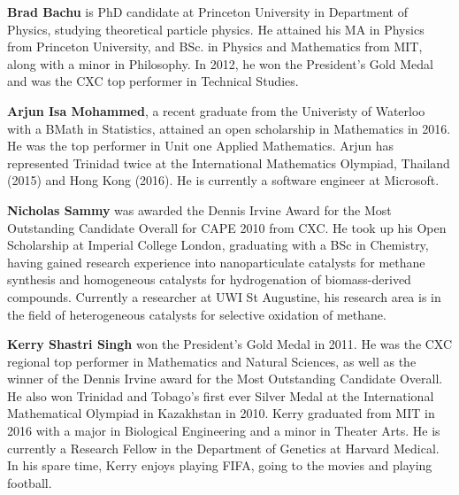 \textbf{Brad Bachu} is PhD candidate at Princeton
University in Department of Physics, studying theoretical particle physics.
He attained his MA in Physics from Princeton University, and BSc. in Physics 
and Mathematics from MIT, along with a minor in Philosophy. In 2012, 
he won the President's Gold Medal and was the CXC top performer in Technical Studies.

\vspace{5pt}

\noindent\textbf{Arjun Isa Mohammed}, a recent graduate from the 
Univeristy of Waterloo with a BMath in Statistics, 
attained an open scholarship in Mathematics in 2016.
He was the top performer in Unit one Applied Mathematics.
Arjun has represented Trinidad twice at the International
Mathematics Olympiad, Thailand (2015) and Hong Kong (2016).
He is currently a software engineer at Microsoft.
\vspace{5pt}

\noindent\textbf{Nicholas Sammy} was awarded the Dennis Irvine Award for 
the Most Outstanding Candidate Overall for CAPE 2010 from CXC. He took up 
his Open Scholarship at Imperial College London, graduating with a BSc in
Chemistry, having gained research experience into nanoparticulate catalysts 
for methane synthesis and homogeneous catalysts for hydrogenation of
biomass-derived compounds. Currently a researcher at UWI St Augustine,
his research area is in the field of heterogeneous catalysts for selective
oxidation of methane.

\vspace{5pt}

\noindent\textbf{Kerry Shastri Singh} won the President's Gold Medal in
2011. He was the CXC regional top performer in Mathematics and Natural
Sciences, as well as the winner of the Dennis Irvine award for the Most
Outstanding Candidate Overall. He also won Trinidad and Tobago's first
ever Silver Medal at the International Mathematical Olympiad in
Kazakhstan in 2010. Kerry graduated from MIT in 2016 with a major in
Biological Engineering and a minor in Theater Arts. He is currently a
Research Fellow in the Department of Genetics at Harvard Medical. In
his spare time, Kerry enjoys playing FIFA, going to the movies
and playing football.
